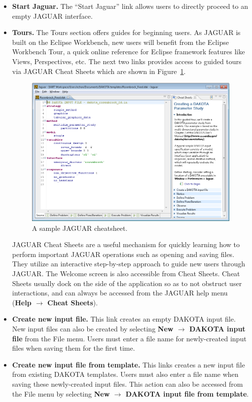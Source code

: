 \begin{itemize}
\item {\bf Start Jaguar.}  The ``Start Jaguar'' link allows users to
  directly proceed to an empty JAGUAR interface.  

\item {\bf Tours.} The Tours section offers guides for beginning
users.  As JAGUAR is built on the Eclipse Workbench, new users will
benefit from the Eclipse Workbench Tour, a quick online reference for
Eclipse framework features like Views, Perspectives, etc.  The next
two links provides access to guided tours via JAGUAR Cheat Sheets
which are shown in Figure~\ref{fig:input:jag_cheatsheets}.
\begin{figure}
  \centering
  \includegraphics[scale=0.6]{images/2_1jag_cheatsheets}
  \caption{A sample JAGUAR cheatsheet.}
  \label{fig:input:jag_cheatsheets}
\end{figure}
JAGUAR Cheat Sheets are a useful mechanism for quickly learning how to
perform important JAGUAR operations such as opening and saving files.
They utilize an interactive step-by-step approach to guide new users
through JAGUAR. The Welcome screen is also accessible from Cheat Sheets. 
Cheat Sheets usually dock on the side of the application so
as to not obstruct user interactions, and can always be accessed from
the JAGUAR help menu ({\bf Help $\rightarrow$ Cheat Sheets}).

\item {\bf Create new input file.}  This link creates an empty DAKOTA
  input file.  New input files can also be created by selecting {\bf
    New $\rightarrow$ DAKOTA input file} from the File menu.  Users
  must enter a file name for newly-created input files when saving
  them for the first time.

\item {\bf Create new input file from template.} This links creates a
  new input file from existing DAKOTA templates. Users must also
  enter a file name when saving these newly-created input files. This
  action can also be accessed from the File menu by selecting {\bf New
  $\rightarrow$ DAKOTA input file from template}.

\end{itemize}

